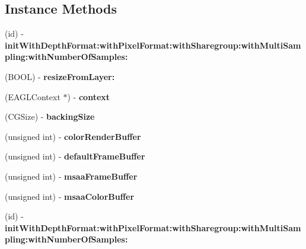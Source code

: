 \subsection*{Instance Methods}
\begin{DoxyCompactItemize}
\item 
\mbox{\label{protocolCCESRenderer_01-p_a59711f3200feef31daec911602cdccf6}} 
(id) -\/ {\bfseries init\+With\+Depth\+Format\+:with\+Pixel\+Format\+:with\+Sharegroup\+:with\+Multi\+Sampling\+:with\+Number\+Of\+Samples\+:}
\item 
\mbox{\label{protocolCCESRenderer_01-p_ada39987e9f16d2a1d4834932ac286cee}} 
(B\+O\+OL) -\/ {\bfseries resize\+From\+Layer\+:}
\item 
\mbox{\label{protocolCCESRenderer_01-p_a2b165504ea08c67fd30dfb8d66b72e2e}} 
(E\+A\+G\+L\+Context $\ast$) -\/ {\bfseries context}
\item 
\mbox{\label{protocolCCESRenderer_01-p_abb45b5c5b64c90c1a4172fbc6b75d00f}} 
(C\+G\+Size) -\/ {\bfseries backing\+Size}
\item 
\mbox{\label{protocolCCESRenderer_01-p_af78510dbd4c0c5e5cb73623637292849}} 
(unsigned int) -\/ {\bfseries color\+Render\+Buffer}
\item 
\mbox{\label{protocolCCESRenderer_01-p_ababfcd4692d0126c60f546b6a35bc0bd}} 
(unsigned int) -\/ {\bfseries default\+Frame\+Buffer}
\item 
\mbox{\label{protocolCCESRenderer_01-p_a0a4ee5acd4c755e6e23ce323c2b30b09}} 
(unsigned int) -\/ {\bfseries msaa\+Frame\+Buffer}
\item 
\mbox{\label{protocolCCESRenderer_01-p_a47f2985b62353346cca11d9fb3e5024c}} 
(unsigned int) -\/ {\bfseries msaa\+Color\+Buffer}
\item 
\mbox{\label{protocolCCESRenderer_01-p_a59711f3200feef31daec911602cdccf6}} 
(id) -\/ {\bfseries init\+With\+Depth\+Format\+:with\+Pixel\+Format\+:with\+Sharegroup\+:with\+Multi\+Sampling\+:with\+Number\+Of\+Samples\+:}

\end{DoxyCompactItemize}

